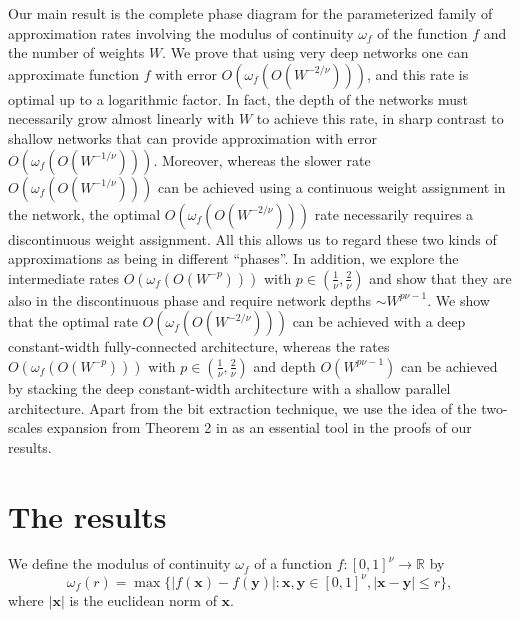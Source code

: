 \documentclass[final, 12pt]{colt2018}
\begin{document}
Our main result is the complete phase diagram for the parameterized family of approximation rates involving the modulus of continuity $\omega_f$ of the function $f$ and the number of weights $W$. We prove that using very deep networks one can approximate function $f$ with error $O(\omega_f(O(W^{-2/\nu})))$, and this  rate is optimal up to a logarithmic factor. In fact, the depth of the networks must necessarily grow almost linearly with $W$ to achieve this rate, in sharp contrast to  shallow networks that can provide approximation with error $O(\omega_f(O(W^{-1/\nu})))$. Moreover, whereas the slower rate $O(\omega_f(O(W^{-1/\nu})))$ can be achieved using a continuous weight assignment in the network, the optimal $O(\omega_f(O(W^{-2/\nu})))$ rate necessarily requires a discontinuous weight assignment. All this allows us to regard these two kinds of approximations as being in different ``phases''. In addition, we explore the intermediate rates $O(\omega_f(O(W^{-p})))$ with $p\in(\frac{1}{\nu},\frac{2}{\nu})$ and show that they are also in the discontinuous phase and require network depths $\sim W^{p\nu-1}.$ We show that the optimal rate $O(\omega_f(O(W^{-2/\nu})))$ can be achieved with a deep constant-width fully-connected architecture, whereas the rates $O(\omega_f(O(W^{-p})))$ with $p\in(\frac{1}{\nu},\frac{2}{\nu})$ and depth $O(W^{p\nu-1})$ can be achieved by stacking the deep constant-width architecture with a shallow parallel architecture.  Apart from the bit extraction technique, we use the idea of the two-scales expansion from Theorem 2 in \cite{yarotsky2017nn} as an essential tool in the proofs of our results.
 

\section{The results}\label{sec:result}
We define the modulus of continuity $\omega_f$ of a function $f:[0,1]^\nu\to\mathbb R$ by \begin{equation}\label{eq:omega}\omega_f(r)=\max\{|f(\mathbf x)-f(\mathbf y)|: \mathbf x, \mathbf y\in [0,1]^\nu, |\mathbf x-\mathbf y|\le r\},\end{equation}
where $|\mathbf x|$ is the euclidean norm of $\mathbf x$. 
\end{document}
